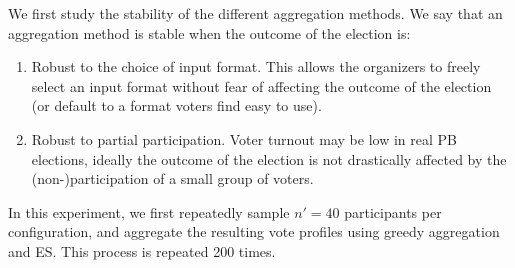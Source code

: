 \documentclass[letterpaper]{article} %
\newcommand{\mes}{ES}
\begin{document}
 



We first study the   stability of the different aggregation methods. %
We say that an aggregation method is stable when the outcome of the election is:
\begin{enumerate}
\item Robust to the choice of input format. This allows the organizers to freely select an input format without fear of affecting the outcome of the election (or default to a format voters find easy to use). 
\item  Robust to partial participation.   Voter turnout may be low in real PB elections, ideally the outcome of the election is not drastically affected by the (non-)participation of a small group of voters. 
\end{enumerate}


In this experiment, we first repeatedly sample $n'=40$ participants per configuration, and aggregate the resulting vote profiles using greedy aggregation and \mes{}. This process is repeated 200 times.%
\end{document}
